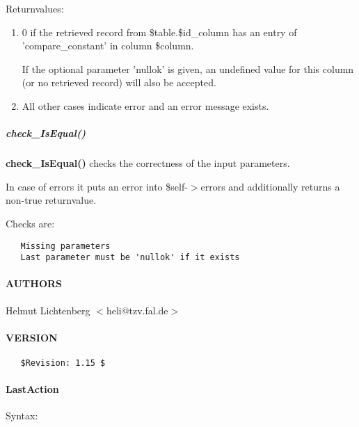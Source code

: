 Returnvalues:

\begin{enumerate}

\item 

0 if the retrieved record from \$table.\$id\_column has an entry of
'compare\_constant' in column \$column.



If the optional parameter 'nullok' is given, an undefined value for this
column (or no retrieved record) will also be accepted.


\item 

All other cases indicate error and an error message exists.

\end{enumerate}
\subparagraph*{check\_IsEqual()\label{IsEqual_check_IsEqual_}}


\textbf{check\_IsEqual()} checks the correctness of the input parameters.



In case of errors it puts an error into \$self-$>$errors and additionally
returns a non-true returnvalue.



Checks are:

\begin{verbatim}
   Missing parameters
   Last parameter must be 'nullok' if it exists
\end{verbatim}
\paragraph*{AUTHORS\label{IsEqual_AUTHORS}}


Helmut Lichtenberg $<$heli@tzv.fal.de$>$

\paragraph*{VERSION\label{IsEqual_VERSION}}
\begin{verbatim}
   $Revision: 1.15 $
\end{verbatim}
\paragraph*{LastAction\label{LastAction}}


Syntax:



